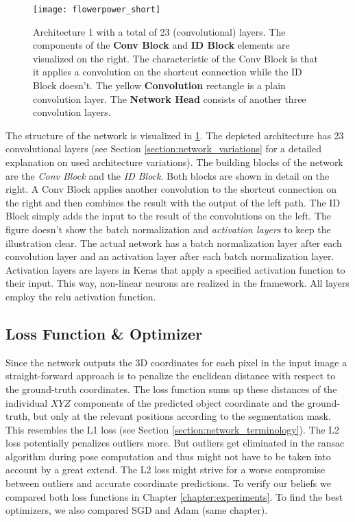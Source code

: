 \begin{figure}[!tbp]
	\centering
    \texttt{[image: flowerpower\_short]}
    \caption{Architecture 1 with a total of 23 (convolutional) layers. The components of the \textbf{Conv Block} and \textbf{ID Block} elements are visualized on the right. The characteristic of the Conv Block is that it applies a convolution on the shortcut connection while the ID Block doesn't. The yellow \textbf{Convolution} rectangle is a plain convolution layer. The \textbf{Network Head} consists of another three convolution layers.}
    	\label{fig:network_architecture}
\end{figure}

The structure of the network is visualized in \fig \ref{fig:network_architecture}. The depicted architecture has 23 convolutional layers (see Section \ref{section:network_variations} for a detailed explanation on used architecture variations). The building blocks of the network are the \textit{Conv Block} and the \textit{ID Block}. Both blocks are shown in detail on the right. A Conv Block applies another convolution to the shortcut connection on the right and then combines the result with the output of the left path. The ID Block simply adds the input to the result of the convolutions on the left. The figure doesn't show the batch normalization and \textit{activation layers} to keep the illustration clear. The actual network has a batch normalization layer after each convolution layer and an activation layer after each batch normalization layer. Activation layers are layers in Keras that apply a specified activation function to their input. This way, non-linear neurons are realized in the framework. All layers employ the \ac{relu} activation function.

\subsection{Loss Function \& Optimizer}

Since the network outputs the 3D coordinates for each pixel in the input image a straight-forward approach is to penalize the euclidean distance with respect to the ground-truth coordinates. The loss function sums up these distances of the individual $XYZ$ components of the predicted object coordinate and the ground-truth, but only at the relevant positions according to the segmentation mask. This resembles the L1 loss (see Section \ref{section:network_terminology}). The L2 loss potentially penalizes outliers more. But outliers get eliminated in the \ac{ransac} algorithm during pose computation and thus might not have to be taken into account by a great extend. The L2 loss might strive for a worse compromise between outliers and accurate coordinate predictions. To verify our beliefs we compared both loss functions in  Chapter \ref{chapter:experiments}. To find the best optimizers, we also compared SGD and Adam (same chapter).

